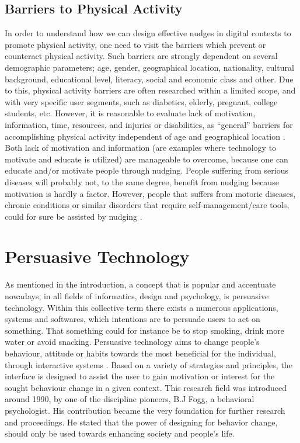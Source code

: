 \subsection{Barriers to Physical Activity} 
In order to understand how we can design effective nudges in digital contexts to promote physical activity, one need to visit the barriers which prevent or counteract physical activity. Such barriers are strongly dependent on several demographic parameters; age, gender, geographical location, nationality, cultural background, educational level, literacy, social and economic class and other\cite{sorensen_perceived_2008}.
Due to this, physical activity barriers are often researched within a limited scope, and with very specific user segments, such as diabetics, elderly, pregnant, college students, etc. However, it is reasonable to evaluate lack of motivation, information, time, resources, and injuries or disabilities, as “general” barriers for accomplishing physical activity independent of age and geographical location \cite{chinn_barriers_1999}. Both lack of motivation and information (are examples where technology to motivate and educate is utilized) are manageable to overcome, because one can educate and/or motivate people through nudging. People suffering from serious diseases will probably not, to the same degree, benefit from nudging because motivation is hardly a factor. However, people that suffers from motoric diseases, chronic conditions or similar disorders that require self-management/care tools, could for sure be assisted by nudging \cite{rouyard_nudging_2018}.

\section{Persuasive Technology}
As mentioned in the introduction, a concept that is popular and accentuate nowadays, in all fields of informatics, design and psychology, is persuasive technology. Within this collective term there exists a numerous applications, systems and softwares, which intentions are to persuade users to act on something. That something could for instance be to stop smoking, drink more water or avoid snacking. Persuasive technology aims to change people’s behaviour, attitude or habits towards the most beneficial for the individual, through interactive systems \cite{orji_persuasive_2018}.
Based on a variety of strategies and principles, the interface is designed to assist the user to gain motivation or interest for the sought behaviour change in a given context. This research field was introduced around 1990, by one of the discipline pioneers, B.J Fogg, a behavioral psychologist. His contribution became the very foundation for further research and proceedings. He stated that the power of designing for behavior change, should only be used towards enhancing society and people's life.

